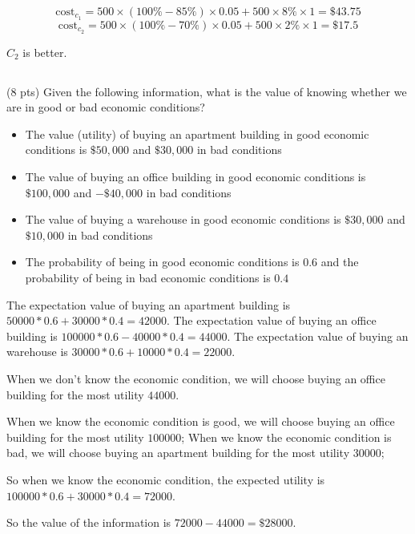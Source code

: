 \documentclass[paper=a4, fontsize=11pt]{scrartcl} %
\begin{document}
\[\text{cost}_{c_1}
= 500\times(100\%-85\%)\times 0.05 + 500\times 8\%\times 1
= \$43.75\]
\[\text{cost}_{c_2}
= 500\times(100\%-70\%)\times 0.05 + 500\times 2\%\times 1
= \$17.5\]

$C_2$ is better.

\subsection{}
\begin{fancyquotes}
  (8 pts) Given the following information, what is the value of
  knowing whether we are in good or bad economic conditions?
  \begin{itemize}
  \item The value (utility) of buying an apartment building in good
    economic conditions is $\$50,000$ and $\$30,000$ in bad conditions
  \item The value of buying an office building in good economic
    conditions is $\$100,000$ and $-\$40,000$ in bad conditions
  \item The value of buying a warehouse in good economic conditions is
    $\$30,000$ and $\$10,000$ in bad conditions
  \item The probability of being in good economic conditions is $0.6$
    and the probability of being in bad economic conditions is $0.4$
  \end{itemize}
\end{fancyquotes}

The expectation value of buying an apartment building is
$50000*0.6+30000*0.4=42000$.
The expectation value of buying an office building is
$100000*0.6-40000*0.4=44000$.
The expectation value of buying an warehouse is
$30000*0.6+10000*0.4=22000$.

When we don't know the economic condition, we will choose buying an
office building for the most utility $44000$.

When we know the economic condition is good, we will choose buying an
office building for the most utility $100000$;
When we know the economic condition is bad, we will choose buying an
apartment building for the most utility $30000$;

So when we know the economic condition, the expected utility is
$100000*0.6+30000*0.4=72000$.

So the value of the information is $72000-44000=\$28000$.

\pagebreak

\end{document}
